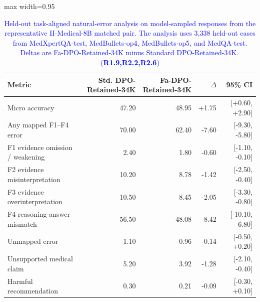 \documentclass[a4paper,fleqn,doubleblind]{cas-sc}
\DeclareRobustCommand{\added}[1]{\textcolor{blue}{#1}}
\DeclareRobustCommand{\revtag}[1]{\textcolor{blue}{\scriptsize\,(\textbf{#1})}}
\begin{document}
\begin{table}[htbp]
    \centering
    \begingroup\color{blue}
    \footnotesize
    \caption{\added{Held-out task-aligned natural-error analysis on model-sampled responses from the representative II-Medical-8B matched pair. The analysis uses 3,338 held-out cases from MedXpertQA-test, MedBullets-op4, MedBullets-op5, and MedQA-test. Deltas are Fa-DPO-Retained-34K minus Standard DPO-Retained-34K.}\revtag{R1.9,R2.2,R2.6}}
    \label{tab:heldout_natural_error_analysis}
    \begin{adjustbox}{max width=0.95\textwidth}
    \begin{tabular}{lrrrr}
        \toprule
        \textbf{Metric} & \textbf{Std. DPO-Retained-34K} & \textbf{Fa-DPO-Retained-34K} & \textbf{$\Delta$} & \textbf{95\% CI} \\
        \midrule
        Micro accuracy & 47.20 & 48.95 & +1.75 & [+0.60, +2.90] \\
        Any mapped F1--F4 error & 70.00 & 62.40 & -7.60 & [-9.30, -5.80] \\
        F1 evidence omission / weakening & 2.40 & 1.80 & -0.60 & [-1.10, -0.10] \\
        F2 evidence misinterpretation & 10.20 & 8.78 & -1.42 & [-2.50, -0.40] \\
        F3 evidence overinterpretation & 10.50 & 8.45 & -2.05 & [-3.30, -0.80] \\
        F4 reasoning-answer mismatch & 56.50 & 48.08 & -8.42 & [-10.10, -6.80] \\
        Unmapped error & 1.10 & 0.96 & -0.14 & [-0.50, +0.20] \\
        Unsupported medical claim & 5.20 & 3.92 & -1.28 & [-2.10, -0.40] \\
        Harmful recommendation & 0.30 & 0.21 & -0.09 & [-0.30, +0.10] \\
        \bottomrule
    \end{tabular}
    \end{adjustbox}
    \endgroup
\end{table}
\end{document}
